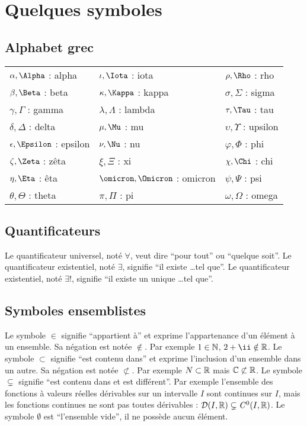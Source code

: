 \chapter{Quelques symboles}
\label{chap:qqsymboles}
%
\section{Alphabet grec}
%
\begin{tabularx}{\textwidth}{XXX}
  $\alpha, \Alpha$ : alpha & $\iota, \Iota$ : iota & $\rho, \Rho$ : rho \\
  $\beta, \Beta$ : beta & $\kappa, \Kappa$ : kappa & $\sigma, \Sigma$ : sigma \\
  $\gamma, \Gamma$ : gamma & $\lambda, \Lambda$ : lambda & $\tau, \Tau$ : tau \\
  $\delta, \Delta$ : delta & $\mu, \Mu$ : mu & $\upsilon, \Upsilon$ : upsilon \\
  $\epsilon, \Epsilon$ : epsilon & $\nu, \Nu$ : nu & $\varphi, \Phi$ : phi \\
  $\zeta, \Zeta$ : zêta & $\xi, \Xi$ : xi & $\chi, \Chi$ : chi \\
  $\eta, \Eta$ : êta & $\omicron, \Omicron$ : omicron & $\psi, \Psi$ : psi\\
  $\theta, \Theta$ : theta & $\pi, \Pi$ : pi & $\omega, \Omega$ : omega
\end{tabularx}
%
\section{Quantificateurs}
%
Le quantificateur universel, noté $\forall$, veut dire ``pour tout'' ou ``quelque soit''. Le quantificateur existentiel, noté $\exists$, signifie ``il existe \ldots tel que''. Le quantificateur existentiel, noté $\exists !$, signifie  ``il existe un unique \ldots tel que''.
%
\section{Symboles ensemblistes}
%
Le symbole $\in$ signifie ``appartient à'' et exprime l'appartenance d'un élément à un ensemble. Sa négation est notée $\notin$. Par exemple $1 \in \mathbb{N}$, $2+\ii \notin \R$. Le symbole $\subset$ signifie ``est contenu dans'' et exprime l'inclusion d'un ensemble dans un autre. Sa négation est notée $\not\subset$. Par exemple $N \subset \mathbb{R}$ mais $\mathbb{C} \not\subset \mathbb{R}$. Le symbole $\subsetneq$ signifie ``est contenu dans et est différent''. Par exemple l'ensemble des fonctions à valeurs réelles dérivables sur un intervalle $I$ sont continues sur $I$, mais les fonctions continues ne sont pas toutes dérivables : $\mathcal{D}(I,\mathbb{R}) \subsetneq \mathit{C}^0(I,\mathbb{R})$. Le symbole $\emptyset$ est ``l'ensemble vide'', il ne possède aucun élément.

